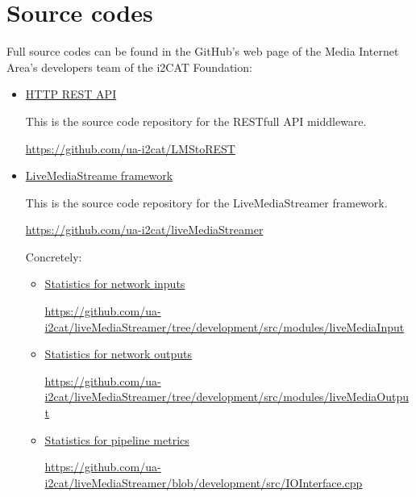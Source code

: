 \chapter{Source codes}\label{ANX:sourceCodes}

Full source codes can be found in the GitHub's web page of the Media Internet Area's developers team of the i2CAT Foundation:

\begin{itemize}
\item \href{https://github.com/ua-i2cat/LMStoREST}{HTTP REST API} \hfill

This is the source code repository for the RESTfull API middleware.\hfill

\url{https://github.com/ua-i2cat/LMStoREST}

\item \href{https://github.com/ua-i2cat/liveMediaStreamer}{LiveMediaStreame framework} \hfill

This is the source code repository for the LiveMediaStreamer framework. \hfill

\url{https://github.com/ua-i2cat/liveMediaStreamer}

Concretely:
\begin{itemize}
\item \href{https://github.com/ua-i2cat/liveMediaStreamer/tree/development/src/modules/liveMediaInput}{Statistics for network inputs} \hfill

\url{https://github.com/ua-i2cat/liveMediaStreamer/tree/development/src/modules/liveMediaInput}

\item \href{https://github.com/ua-i2cat/liveMediaStreamer/tree/development/src/modules/liveMediaOutput}{Statistics for network outputs} \hfill

\url{https://github.com/ua-i2cat/liveMediaStreamer/tree/development/src/modules/liveMediaOutput}
\item \href{https://github.com/ua-i2cat/liveMediaStreamer/blob/development/src/IOInterface.cpp}{Statistics for pipeline metrics} \hfill

\url{https://github.com/ua-i2cat/liveMediaStreamer/blob/development/src/IOInterface.cpp}
\end{itemize}


\end{itemize}


